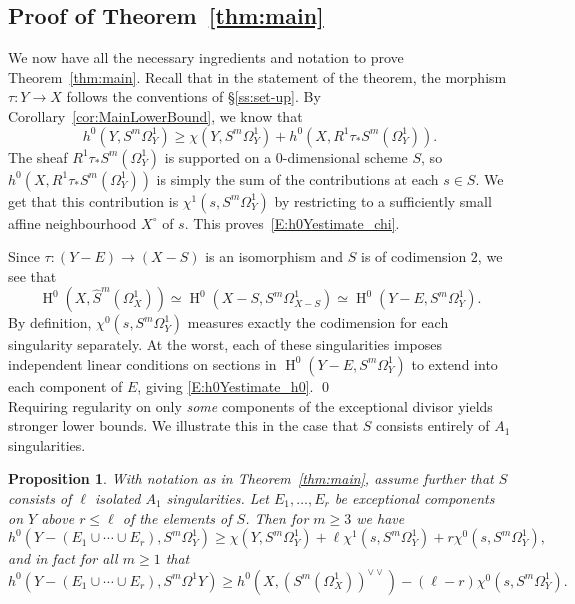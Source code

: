 \documentclass[12pt, reqno]{amsart}
\newtheorem{prop}[lemma]{Proposition}
\theoremstyle{definition}
\DeclareMathOperator{\HH}{H}
\numberwithin{equation}{section}
\numberwithin{table}{section}
\begin{document}
\subsection{Proof of Theorem~\ref{thm:main}}
We now have all the necessary ingredients and notation to prove Theorem~\ref{thm:main}.  Recall that in the statement of the theorem, the morphism $\tau\colon Y \to X$ follows the conventions of \S\ref{ss:set-up}.
By Corollary~\ref{cor:MainLowerBound}, we know that 
\[h^0(Y,S^m\Omega^1_Y)\geq
\chi(Y,S^m\Omega^1_Y)+h^0(X,R^1\tau_*S^m(\Omega^1_Y)).\]
The sheaf $R^1\tau_*S^m(\Omega^1_Y)$ is supported on a $0$-dimensional scheme $S$, so $h^0(X,R^1\tau_*S^m(\Omega^1_Y))$ is simply the sum of the contributions at each $s\in S$. We get that this contribution is  $\chi^1(s,S^m\Omega^1_Y)$ by restricting to a sufficiently small affine neighbourhood $X^\circ$ of $s$. This proves~\eqref{E:h0Yestimate_chi}.

Since $\tau\colon (Y-E)\to (X-S)$ is an isomorphism and $S$ is of codimension $2$, we see that
\[\HH^0(X,\hat S^m(\Omega^1_X))\simeq \HH^0(X-S,S^m\Omega^1_{X-S})\simeq \HH^0(Y-E,S^m\Omega^1_Y).\]
By definition, $\chi^0(s,S^m\Omega^1_Y)$ measures exactly the codimension for each singularity separately. At the worst, each of these singularities imposes independent linear conditions on sections in $\HH^0(Y-E,S^m\Omega^1_Y)$ to extend into each component of $E$, giving \eqref{E:h0Yestimate_h0}.
\qed \\

Requiring regularity on only \emph{some} components of the exceptional divisor yields stronger lower bounds.  We illustrate this in the case that $S$ consists entirely of $A_1$ singularities.

\begin{prop}\label{C:regdif_lowerbound_quasiproj}
With notation as in Theorem~\ref{thm:main}, assume further that $S$ consists of $\ell$ isolated $A_1$ singularities.
Let $E_1,\ldots,E_r$ be exceptional components on $Y$ above $r\leq \ell$ of the elements of $S$. Then for $m\geq 3$ we have
\begin{equation}\label{E:h0Yestimate_chi_r}
h^0(Y-(E_1\cup\cdots\cup E_r),S^m\Omega^1_Y)\geq \chi(Y,S^m\Omega^1_Y)+\ell\chi^1(s,S^m\Omega^1_Y)+r\chi^0(s,S^m\Omega^1_Y),
\end{equation}
and in fact for all $m\geq 1$ that
\begin{equation}\label{E:h0Yestimate_h0_r}
h^0(Y-(E_1\cup\cdots\cup E_r),S^m\Omega^1Y)\geq h^0(X,(S^m(\Omega^1_X))^{\vee\vee}) -(\ell-r)\chi^0(s,S^m\Omega^1_Y).
\end{equation}
\end{prop}
\end{document}
